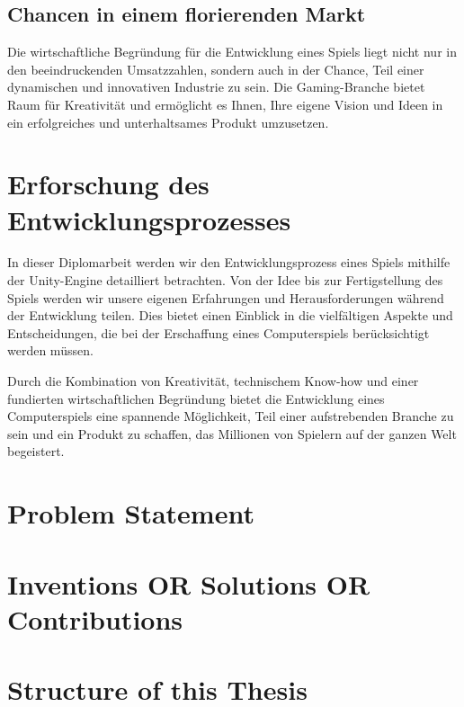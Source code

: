 \subsection{Chancen in einem florierenden Markt}
Die wirtschaftliche Begründung für die Entwicklung eines Spiels liegt nicht nur in den beeindruckenden Umsatzzahlen, sondern auch in der Chance, Teil einer dynamischen und innovativen Industrie zu sein. Die Gaming-Branche bietet Raum für Kreativität und ermöglicht es Ihnen, Ihre eigene Vision und Ideen in ein erfolgreiches und unterhaltsames Produkt umzusetzen.

\section{Erforschung des Entwicklungsprozesses}
In dieser Diplomarbeit werden wir den Entwicklungsprozess eines Spiels mithilfe der Unity-Engine detailliert betrachten. Von der Idee bis zur Fertigstellung des Spiels werden wir unsere eigenen Erfahrungen und Herausforderungen während der Entwicklung teilen. Dies bietet einen Einblick in die vielfältigen Aspekte und Entscheidungen, die bei der Erschaffung eines Computerspiels berücksichtigt werden müssen.

Durch die Kombination von Kreativität, technischem Know-how und einer fundierten wirtschaftlichen Begründung bietet die Entwicklung eines Computerspiels eine spannende Möglichkeit, Teil einer aufstrebenden Branche zu sein und ein Produkt zu schaffen, das Millionen von Spielern auf der ganzen Welt begeistert.

\section{Problem Statement}

\section{Inventions OR Solutions OR Contributions}

\section{Structure of this Thesis}